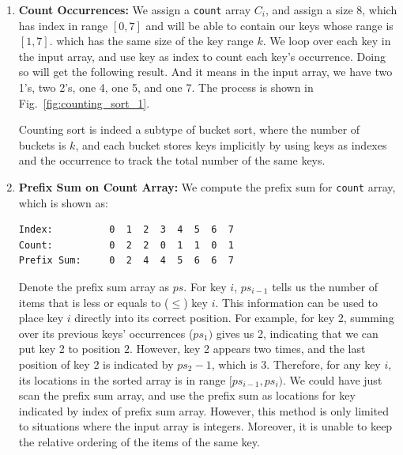 \documentclass[../main.tex]{subfiles}
\begin{document}
\begin{enumerate}
    \item \textbf{Count Occurrences:} We assign a \texttt{count} array $C_i$, and assign a size 8, which has index in range $[0, 7]$ and will be able to contain our keys whose range is $[1, 7]$.  which has the same size of the key range $k$. We loop over each key in the input array, and use key as index to  count each key's occurrence. Doing so will get the following result. And it means in the input array, we have two 1's, two 2's, one 4, one 5, and one 7. The process is shown in Fig.~\ref{fig:counting_sort_1}.
    
    Counting sort is indeed a subtype of bucket sort, where the number of buckets is $k$, and each bucket stores keys implicitly by using keys as indexes and the occurrence to track the total number of the same keys. 

\item \textbf{Prefix Sum on Count Array:} We compute the prefix sum for \texttt{count} array, which is shown as:
\begin{lstlisting}[numbers=none]
Index:          0  1  2  3  4  5  6  7
Count:          0  2  2  0  1  1  0  1
Prefix Sum:     0  2  4  4  5  6  6  7
\end{lstlisting}
Denote the prefix sum array as $ps$. For key $i$, $ps_{i-1}$ tells us the number of items that is less or equals to ($\leq$) key $i$. This information can be used to place key $i$ directly into its correct position. For example, for key 2, summing over its previous keys' occurrences ($ps_{1})$ gives us 2, indicating that we can put key 2 to position $2$. However, key 2 appears two times, and the last position of key 2 is indicated by $ps_2 - 1$, which is 3.  Therefore, for any key $i$, its locations in the sorted array is in range $[ps_{i-1}, ps_i)$. 
We could have just scan the prefix sum array, and use the prefix sum as locations for key indicated by index of prefix sum array. However, this method is only limited to  situations where the input array is integers. Moreover, it is unable to keep the relative ordering of the items of the same key. 


\end{enumerate}
\end{document}
